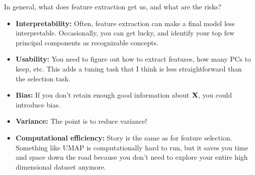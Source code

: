 In general, what does feature extraction get us, and what are the risks? 
\begin{itemize}
\item \textbf{Interpretability:} Often, feature extraction can make a final model less interpretable. Occasionally, you can get lucky, and identify your top few principal components as recognizable concepts. 
\item \textbf{Usability:} You need to figure out how to extract features, how many PCs to keep, etc. This adds a tuning task that I think is less straightforward than the selection task. 
\item \textbf{Bias:} If you don't retain enough good information about $\bold{X}$, you could introduce bias. 
\item \textbf{Variance:} The point is to reduce variance! 
\item \textbf{Computational efficiency:} Story is the same as for feature selection. Something like UMAP is computationally hard to run, but it saves you time and space down the road because you don't need to explore your entire high dimensional dataset anymore. 
\end{itemize}

